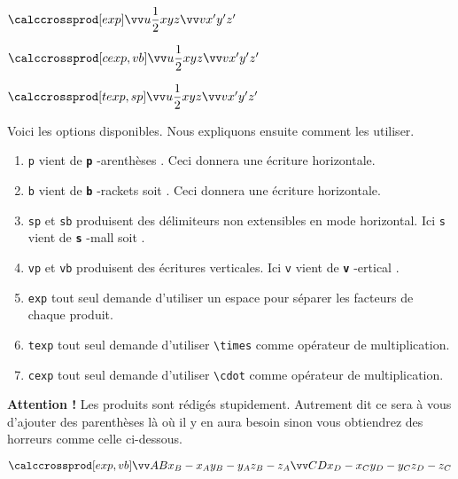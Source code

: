 \documentclass[12pt,a4paper]{article}
\makeatletter
\theoremstyle{definition}
\newcommand\env[1]{\texttt{#1}}
\newcommand\macro[1]{\env{\textbackslash{}#1}}
\newcommand\whyprefix[2]{%
    \textbf{\prefix{#1}}-#2%
}
\newcommand\prefix[1]{%
    \texttt{#1}%
}
\newcommand\inenglish{\@ifstar{\@inenglish@star}{\@inenglish@no@star}}
\newcommand\@inenglish@star[1]{%
    \emph{\og #1 \fg}%
}
\newcommand\@inenglish@no@star[1]{%
    \@inenglish@star{#1} en anglais%
}
\makeatother
\begin{document}
\begin{latexex}
$\vcalccrossprod[exp]%
                {u}{\dfrac{1}{2}x}{y}{z}%
                {v}{x'}{y'}{z'}$

$\vcalccrossprod[cexp,vb]%
                {u}{\dfrac{1}{2}x}{y}{z}%
                {v}{x'}{y'}{z'}$

$\vcalccrossprod[texp,sp]%
                {u}{\dfrac{1}{2}x}{y}{z}%
                {v}{x'}{y'}{z'}$
\end{latexex}


\medskip


Voici les options disponibles. Nous expliquons ensuite comment les utiliser.
\begin{enumerate}
	\item \prefix{p} vient de \whyprefix{p}{arenthèses}. Ceci donnera une écriture horizontale.

	\item \prefix{b} vient de \whyprefix{b}{rackets} soit \inenglish{crochets}. Ceci donnera une écriture horizontale.

	\item \prefix{sp} et \prefix{sb} produisent des délimiteurs non extensibles en mode horizontal.
	      Ici \prefix{s} vient de \whyprefix{s}{mall} soit \inenglish{petit}.

	\item \prefix{vp} et \prefix{vb} produisent des écritures verticales.
	      Ici \prefix{v} vient de \whyprefix{v}{ertical}.

	\medskip

	\item \prefix{exp} tout seul demande d'utiliser un espace pour séparer les facteurs de chaque produit.

	\item \prefix{texp} tout seul demande d'utiliser \macro{times} comme opérateur de multiplication.

	\item \prefix{cexp} tout seul demande d'utiliser \macro{cdot} comme opérateur de multiplication.
\end{enumerate}

\bigskip


\textbf{Attention !}
Les produits sont rédigés stupidement. Autrement dit ce sera à vous d'ajouter des parenthèses là où il y en aura besoin sinon vous obtiendrez des horreurs comme celle ci-dessous.
    
\begin{latexex}
$\vcalccrossprod[exp,vb]%
 {AB}%
 {x_B - x_A}{y_B - y_A}{z_B - z_A}%
 {CD}%
 {x_D - x_C}{y_D - y_C}{z_D - z_C}$
\end{latexex}
\end{document}
